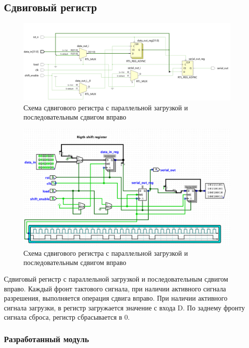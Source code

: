 \documentclass[12pt,onecolumn]{article}
\begin{document}
\subsection{Сдвиговый регистр}
\begin{figure}[H]
  \centering
  \includegraphics[width=\textwidth]{image/shift-right.png}
  \caption{Схема сдвигового регистра с параллельной загрузкой и последовательным сдвигом вправо}
\end{figure}
\begin{figure}[H]
    \centering
    \includegraphics[width=\textwidth]{image/right-shift-reg.png}
    \caption{Схема сдвигового регистра с параллельной загрузкой и последовательным сдвигом вправо}
  \end{figure}
Сдвиговый регистр с параллельной загрузкой и последовательным сдвигом вправо.
Каждый фронт тактового сигнала, при наличии активного сигнала разрешения, выполняется операция сдвига вправо.
При наличии активного сигнала загрузки, в регистр загружается значение с входа D.
По заднему фронту сигнала сброса, регистр сбрасывается в 0.
\subsubsection{Разработанный модуль}

\end{document}
